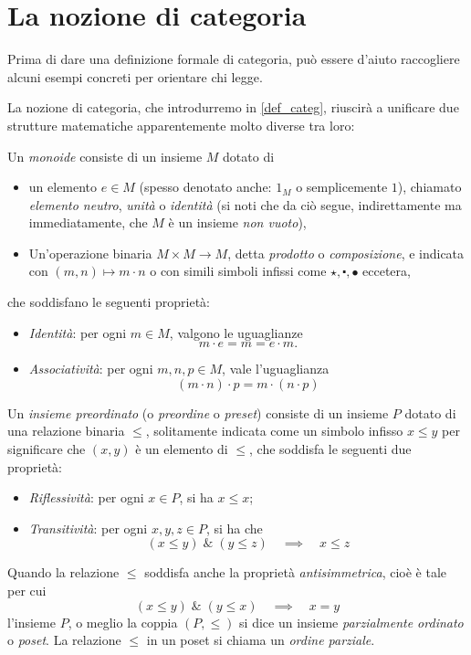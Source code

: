 \section{La nozione di categoria}\label{sec_categorie}

Prima di dare una definizione formale di categoria, può essere d'aiuto raccogliere alcuni esempi concreti per orientare chi legge.

La nozione di categoria, che introdurremo in \ref{def_categ}, riuscirà a unificare due strutture matematiche apparentemente molto diverse tra loro:
\begin{definition}\label{prelim_def_monoide}
	Un \emph{monoide} consiste di un insieme \(M\) dotato di
	\begin{itemize}
		\item un elemento \(e\in M\) (spesso denotato anche: \(1_M\) o semplicemente \(1\)), chiamato \emph{elemento neutro}, \emph{unità} o \emph{identità} (si noti che da ciò segue, indirettamente ma immediatamente, che \(M\) è un insieme \emph{non vuoto}),
		\item Un'operazione binaria \(M\times M\to M\), detta \emph{prodotto} o \emph{composizione}, e indicata con \((m,n)\mapsto m\cdot n\) o con simili simboli infissi come \(\star, \centerdot,\bullet\) eccetera,
	\end{itemize}
	che soddisfano le seguenti proprietà:
	\begin{itemize}
		\item \emph{Identità}: per ogni \(m\in M\), valgono le uguaglianze
		      \[m\cdot e = m = e\cdot m.\]
		\item \emph{Associatività}: per ogni \(m,n,p\in M\), vale l'uguaglianza
		      \[(m\cdot n)\cdot p = m\cdot (n\cdot p)\]
	\end{itemize}
\end{definition}
\begin{definition}\label{prelim_def_preset}
	Un \emph{insieme preordinato} (o \emph{preordine} o \emph{preset}) consiste di un insieme \(P\) dotato di una relazione binaria \(\le\), solitamente indicata come un simbolo infisso \(x\le y\) per significare che \((x,y)\) è un elemento di \(\le\), che soddisfa le seguenti due proprietà:
	\begin{itemize}
		\item \emph{Riflessività}: per ogni \(x\in P\), si ha \(x\le x\);
		\item \emph{Transitività}: per ogni \(x,y,z\in P\), si ha che
		      \[(x\le y)\;\&\;(y\le z) \quad\implies\quad x\le z\]
	\end{itemize}
	Quando la relazione \(\le\) soddisfa anche la proprietà \emph{antisimmetrica}, cioè è tale per cui
	\[(x\le y)\;\&\;(y\le x) \quad\implies\quad x = y\]
	l'insieme \(P\), o meglio la coppia \((P,\le)\) si dice un insieme \emph{parzialmente ordinato} o \emph{poset}. La relazione \(\le\) in un poset si chiama un \emph{ordine parziale}.
\end{definition}
